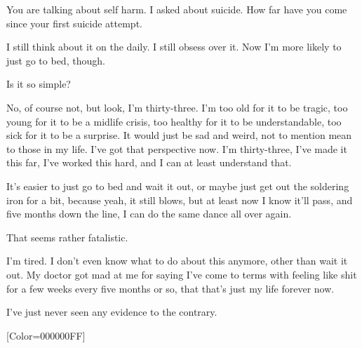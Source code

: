 \begin{paracol}{2}
\begin{leftcolumn}
\begin{ally}
You are talking about self harm. I asked about suicide. How far have you come since your first suicide attempt.
\end{ally}
I still think about it on the daily. I still obsess over it. Now I'm more likely to just go to bed, though.

\begin{ally}
Is it so simple?
\end{ally}
No, of course not, but look, I'm thirty-three. I'm too old for it to be tragic, too young for it to be a midlife crisis, too healthy for it to be understandable, too sick for it to be a surprise. It would just be sad and weird, not to mention mean to those in my life. I've got that perspective now. I'm thirty-three, I've made it this far, I've worked this hard, and I can at least understand that.

It's easier to just go to bed and wait it out, or maybe just get out the soldering iron for a bit, because yeah, it still blows, but at least now I know it'll pass, and five months down the line, I can do the same dance all over again.

\begin{ally}
That seems rather fatalistic.
\end{ally}
I'm tired. I don't even know what to do about this anymore, other than wait it out. My doctor got mad at me for saying I've come to terms with feeling like shit for a few weeks every five months or so, that that's just my life forever now.

I've just never seen any evidence to the contrary.
\newpage
\end{leftcolumn}
\end{paracol}
\resetbackgroundcolor

\renewfontfamily{}[Color=000000FF]
